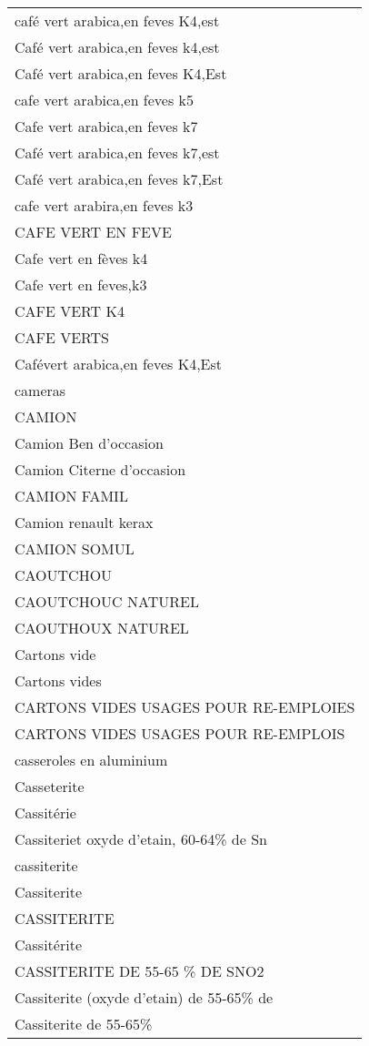 \documentclass[
]{book}
\begin{document}
\begin{longtable}[t]{l}
café vert arabica,en feves K4,est\\
Café vert arabica,en feves k4,est\\
Café vert arabica,en feves K4,Est\\
cafe vert arabica,en feves k5\\
\addlinespace
Cafe vert arabica,en feves k7\\
Café vert arabica,en feves k7,est\\
Café vert arabica,en feves k7,Est\\
cafe vert arabira,en feves k3\\
CAFE VERT EN FEVE\\
\addlinespace
Cafe vert en fèves k4\\
Cafe vert en feves,k3\\
CAFE VERT K4\\
CAFE VERTS\\
Cafévert arabica,en feves K4,Est\\
\addlinespace
cameras\\
CAMION\\
Camion Ben d'occasion\\
Camion Citerne d'occasion\\
CAMION FAMIL\\
\addlinespace
Camion renault kerax\\
CAMION SOMUL\\
CAOUTCHOU\\
CAOUTCHOUC NATUREL\\
CAOUTHOUX NATUREL\\
\addlinespace
Cartons vide\\
Cartons vides\\
CARTONS VIDES USAGES POUR RE-EMPLOIES\\
CARTONS VIDES USAGES POUR RE-EMPLOIS\\
casseroles en aluminium\\
\addlinespace
Casseterite\\
Cassitérie\\
Cassiteriet oxyde d'etain, 60-64\% de Sn\\
cassiterite\\
Cassiterite\\
\addlinespace
CASSITERITE\\
Cassitérite\\
CASSITERITE  DE 55-65 \% DE SNO2\\
Cassiterite (oxyde d'etain) de 55-65\% de\\
Cassiterite de 55-65\%\\

\end{longtable}
\end{document}
